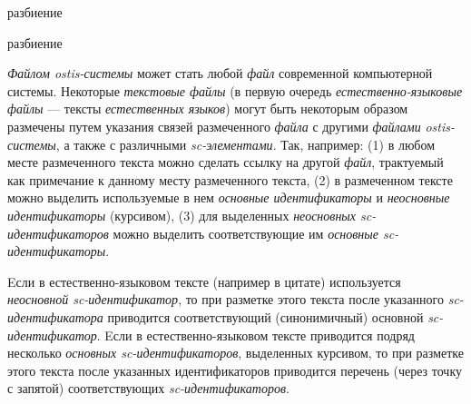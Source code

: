 \begin{SCn}

    \begin{scnrelfromset}{разбиение}
    \end{scnrelfromset}
    \begin{scnrelfromset}{разбиение}
            \begin{scnindent}
            \scnidtf{обозначение одного из вхождений (однорго из экземпляров) информационной конструкции]}
            \end{scnindent}
            \begin{scnindent}
            \end{scnindent}
    \end{scnrelfromset}
    \begin{scnindent}
        \begin{scnindent}
        \end{scnindent}
    \end{scnindent}

    \textit{Файлом ostis-системы} может стать любой \textit{файл} современной компьютерной системы.
    Некоторые \textit{текстовые файлы} (в первую очередь \textit{естественно-языковые файлы} --- тексты \textit{естественных языков}) могут быть некоторым образом размечены путем указания связей размеченного \textit{файла} с другими \textit{файлами} \textit{ostis-системы}, а также с различными \textit{sc-элементами}.
    Так, например: (1) в любом месте размеченного текста можно сделать ссылку на другой \textit{файл}, трактуемый как примечание к данному месту размеченного текста, (2) в размеченном тексте можно выделить используемые в нем \textit{основные идентификаторы} и \textit{неосновные идентификаторы} (курсивом), (3) для выделенных \textit{неосновных sc-идентификаторов} можно выделить соответствующие им \textit{основные sc-идентификаторы}.

    Eсли в естественно-языковом тексте (например в цитате) используется \textit{неосновной sc-идентификатор}, то при разметке этого текста после указанного \textit{sc-идентификатора} приводится соответствующий (синонимичный) основной \textit{sc-идентификатор}.
    Eсли в естественно-языковом тексте приводится подряд несколько \textit{основных sc-идентификаторов}, выделенных курсивом, то при разметке этого текста после указанных идентификаторов приводится перечень (через точку с запятой) соответствующих \textit{sc-идентификаторов}.


\end{SCn}
